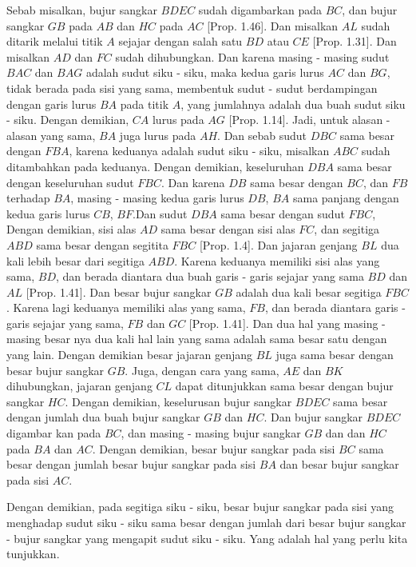 \documentclass[a4paper]{book}
\begin{document}
Sebab misalkan, bujur sangkar $BDEC$ sudah digambarkan pada $BC$, dan bujur 
sangkar $GB$ pada $AB$ dan $HC$ pada $AC$ [Prop. 1.46]. Dan misalkan $AL$ 
sudah ditarik melalui titik $A$ sejajar dengan salah satu $BD$ atau $CE$ 
[Prop. 1.31]. Dan misalkan $AD$ dan $FC$ sudah dihubungkan. Dan karena masing
- masing sudut $BAC$ dan $BAG$ adalah sudut siku - siku, maka kedua garis 
lurus $AC$ dan $BG$, tidak berada pada sisi yang sama, membentuk sudut - sudut 
berdampingan dengan garis lurus $BA$ pada titik $A$, yang jumlahnya
adalah dua buah sudut siku - siku. Dengan demikian, $CA$ lurus pada $AG$ 
[Prop. 1.14]. Jadi, untuk alasan - alasan yang sama, $BA$ juga lurus pada $AH$.
Dan sebab sudut $DBC$ sama besar dengan $FBA$, karena keduanya adalah sudut
siku - siku, misalkan $ABC$ sudah ditambahkan pada keduanya. Dengan demikian, 
keseluruhan $DBA$ sama besar dengan keseluruhan sudut $FBC$. Dan karena $DB$
sama besar dengan $BC$, dan $FB$ terhadap $BA$, masing - masing kedua garis 
lurus $DB$, $BA$ sama panjang dengan kedua garis lurus $CB$, $BF$.Dan sudut
$DBA$ sama besar dengan sudut $FBC$, Dengan demikian, sisi alas $AD$ sama 
besar dengan sisi alas $FC$, dan segitiga $ABD$ sama besar dengan segitita
$FBC$ [Prop. 1.4]. Dan jajaran genjang $BL$ dua kali lebih besar dari segitiga
$ABD$. Karena keduanya memiliki sisi alas yang sama, $BD$, dan berada diantara
dua buah garis - garis sejajar yang sama $BD$ dan $AL$ [Prop. 1.41]. Dan
besar bujur sangkar $GB$ adalah dua kali besar segitiga $FBC$. Karena 
lagi keduanya memiliki alas yang sama, $FB$, dan berada diantara garis - garis
sejajar yang sama, $FB$ dan $GC$ [Prop. 1.41]. Dan dua hal yang masing - masing 
besar nya dua kali hal lain yang sama adalah sama besar satu dengan yang lain.
Dengan demikian besar jajaran genjang $BL$ juga sama besar dengan besar 
bujur sangkar $GB$. Juga, dengan cara yang sama, $AE$ dan $BK$ dihubungkan, 
jajaran genjang $CL$ dapat ditunjukkan sama besar dengan bujur sangkar
$HC$. Dengan demikian, keselurusan bujur sangkar $BDEC$ sama besar dengan
jumlah dua buah bujur sangkar $GB$ dan $HC$. Dan bujur sangkar $BDEC$ digambar
kan pada $BC$, dan masing - masing bujur sangkar $GB$ dan dan $HC$ pada
$BA$ dan $AC$. Dengan demikian, besar bujur sangkar pada sisi $BC$ sama besar 
dengan jumlah besar bujur sangkar pada sisi $BA$ dan besar bujur sangkar pada
sisi $AC$.

Dengan demikian, pada segitiga siku - siku, besar bujur sangkar pada sisi yang
menghadap sudut siku - siku sama besar dengan jumlah dari besar bujur sangkar
- bujur sangkar yang mengapit sudut siku - siku. Yang adalah hal yang perlu
kita tunjukkan.  
\end{document}
